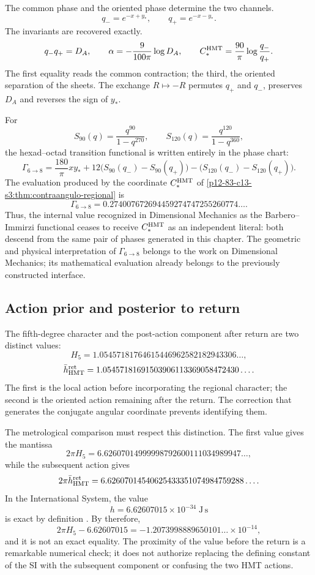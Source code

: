 The common phase and the oriented phase determine the two channels.
\[
q_-=e^{-x+y_*},
\qquad
q_+=e^{-x-y_*}.
\]
The invariants are recovered exactly.
\[
q_-q_+=D_A,
\qquad
\alpha=-\frac9{100\pi}\log D_A,
\qquad
C_*^{\rm HMT}=\frac{90}{\pi}\log\frac{q_-}{q_+}.
\]
The first equality reads the common contraction; the third, the oriented
separation of the sheets. The exchange \(R\mapsto-R\) permutes
\(q_+\) and \(q_-\), preserves \(D_A\) and reverses the sign of \(y_*\).

For
\[
S_{90}(q)=\frac{q^{90}}{1-q^{270}},
\qquad
S_{120}(q)=\frac{q^{120}}{1-q^{360}},
\]
the hexad--octad transition functional is written entirely in the
phase chart:
\[
\Gamma_{6\to8}
=\frac{180}{\pi}xy_*
+12\bigl(S_{90}(q_-)-S_{90}(q_+)\bigr)
-\bigl(S_{120}(q_-)-S_{120}(q_+)\bigr).
\]
The evaluation produced by the coordinate \(C_*^{\rm HMT}\) of
\cref{p12-83-c13-s3:thm:contraangulo-regional} is
\[
\boxed{
\Gamma_{6\to8}
=0.274007672694459274747255260774\ldots.}
\]
Thus, the internal value recognized in Dimensional Mechanics as the Barbero--Immirzi functional ceases to receive \(C_*^{\rm HMT}\) as an independent literal: both descend from the same pair of phases generated in this chapter. The geometric and physical interpretation of \(\Gamma_{6\to8}\) belongs to the work on Dimensional Mechanics; its mathematical evaluation already belongs to the previously constructed interface.

\subsection{Action prior and posterior to return}

The fifth-degree character and the post-action component after return
are two distinct values:
\[
H_5
=1.05457181764615446962582182943306\ldots,
\]
\[
\bar h_{\rm HMT}^{\rm ret}
=1.05457181691503906113369058472430\ldots.
\]
The first is the local action before incorporating the regional character; the
second is the oriented action remaining after the return. The correction
that generates the conjugate angular coordinate prevents identifying them.

The metrological comparison must respect this distinction. The first value gives
the mantissa
\[
2\pi H_5
=6.62607014999998792600111034989947\ldots,
\]
while the subsequent action gives
\[
2\pi\bar h_{\rm HMT}^{\rm ret}
=6.62607014540625433351074984759288\ldots.
\]
In the International System, the value
\[
h=6.62607015\times10^{-34}\;\mathrm{J\,s}
\]
is exact by definition \cite{BIPMSI}. By therefore,
\[
2\pi H_5-6.62607015
=-1.2073998889650101\ldots\times10^{-14},
\]
and it is not an exact equality. The proximity of the value before the return is
a remarkable numerical check; it does not authorize replacing the defining constant
of the SI with the subsequent component or confusing the two HMT actions\@.

